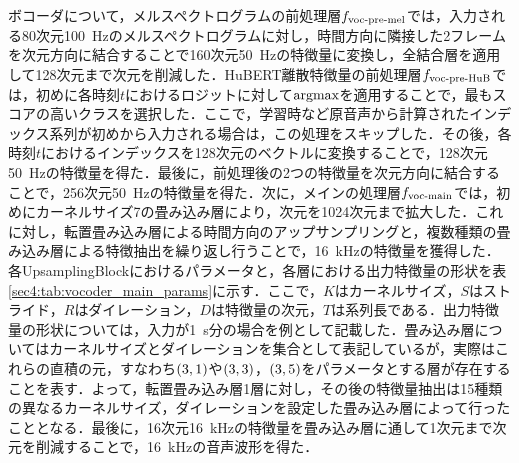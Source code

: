ボコーダについて，メルスペクトログラムの前処理層$f_{\text{voc-pre-mel}}$では，入力される80次元\SI{100}{\Hz}のメルスペクトログラムに対し，時間方向に隣接した2フレームを次元方向に結合することで160次元\SI{50}{\Hz}の特徴量に変換し，全結合層を適用して128次元まで次元を削減した．HuBERT離散特徴量の前処理層$f_{\text{voc-pre-HuB}}$では，初めに各時刻$t$におけるロジットに対して$\text{argmax}$を適用することで，最もスコアの高いクラスを選択した．ここで，学習時など原音声から計算されたインデックス系列が初めから入力される場合は，この処理をスキップした．その後，各時刻$t$におけるインデックスを128次元のベクトルに変換することで，128次元\SI{50}{\Hz}の特徴量を得た．最後に，前処理後の2つの特徴量を次元方向に結合することで，256次元\SI{50}{\Hz}の特徴量を得た．次に，メインの処理層$f_{\text{voc-main}}$では，初めにカーネルサイズ7の畳み込み層により，次元を1024次元まで拡大した．これに対し，転置畳み込み層による時間方向のアップサンプリングと，複数種類の畳み込み層による特徴抽出を繰り返し行うことで，\SI{16}{\kHz}の特徴量を獲得した．各UpsamplingBlockにおけるパラメータと，各層における出力特徴量の形状を表\ref{sec4:tab:vocoder_main_params}に示す．ここで，$K$はカーネルサイズ，$S$はストライド，$R$はダイレーション，$D$は特徴量の次元，$T$は系列長である．出力特徴量の形状については，入力が\SI{1}{s}分の場合を例として記載した．畳み込み層についてはカーネルサイズとダイレーションを集合として表記しているが，実際はこれらの直積の元，すなわち$\left(3, 1\right)$や$\left(3, 3\right)$，$\left(3, 5\right)$をパラメータとする層が存在することを表す．よって，転置畳み込み層1層に対し，その後の特徴量抽出は15種類の異なるカーネルサイズ，ダイレーションを設定した畳み込み層によって行ったこととなる．最後に，16次元\SI{16}{\kHz}の特徴量を畳み込み層に通して1次元まで次元を削減することで，\SI{16}{\kHz}の音声波形を得た．
